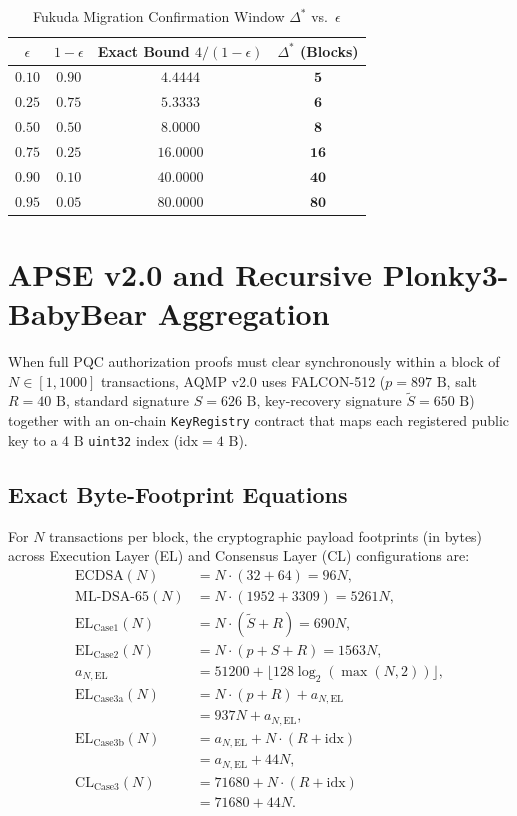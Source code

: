 \documentclass[conference,compsoc]{IEEEtran}
\begin{document}
\begin{table}[t]
\centering
\caption{Fukuda Migration Confirmation Window $\Delta^*$ vs.\ $\epsilon$}
\label{tab:fukuda}
\begin{tabular}{@{}cccc@{}}
\toprule
$\epsilon$ & $1 - \epsilon$ & Exact Bound $4/(1-\epsilon)$ & $\Delta^*$ (Blocks) \\
\midrule
$0.10$ & $0.90$ & $4.4444$ & $\mathbf{5}$ \\
$0.25$ & $0.75$ & $5.3333$ & $\mathbf{6}$ \\
$0.50$ & $0.50$ & $8.0000$ & $\mathbf{8}$ \\
$0.75$ & $0.25$ & $16.0000$ & $\mathbf{16}$ \\
$0.90$ & $0.10$ & $40.0000$ & $\mathbf{40}$ \\
$0.95$ & $0.05$ & $80.0000$ & $\mathbf{80}$ \\
\bottomrule
\end{tabular}
\end{table}

\section{APSE v2.0 and Recursive Plonky3-BabyBear Aggregation}
\label{sec:apse}

When full PQC authorization proofs must clear synchronously within a block of $N \in [1, 1000]$ transactions, AQMP v2.0 uses FALCON-512 ($p = 897\text{ B}$, salt $R = 40\text{ B}$, standard signature $S = 626\text{ B}$, key-recovery signature $\tilde{S} = 650\text{ B}$) together with an on-chain \texttt{KeyRegistry} contract that maps each registered public key to a $4\text{ B}$ \texttt{uint32} index ($\text{idx} = 4\text{ B}$).

\subsection{Exact Byte-Footprint Equations}
For $N$ transactions per block, the cryptographic payload footprints (in bytes) across Execution Layer (EL) and Consensus Layer (CL) configurations are:
\begin{align}
\text{ECDSA}(N) &= N \cdot (32 + 64) = 96N, \\
\text{ML-DSA-65}(N) &= N \cdot (1952 + 3309) = 5261N, \\
\text{EL}_{\text{Case1}}(N) &= N \cdot (\tilde{S} + R) = 690N, \\
\text{EL}_{\text{Case2}}(N) &= N \cdot (p + S + R) = 1563N, \\
a_{N,\text{EL}} &= 51200 + \lfloor 128 \log_2(\max(N, 2)) \rfloor, \\
\text{EL}_{\text{Case3a}}(N) &= N \cdot (p + R) + a_{N,\text{EL}} \nonumber \\
  &= 937N + a_{N,\text{EL}}, \\
\text{EL}_{\text{Case3b}}(N) &= a_{N,\text{EL}} + N \cdot (R + \text{idx}) \nonumber \\
  &= a_{N,\text{EL}} + 44N, \\
\text{CL}_{\text{Case3}}(N) &= 71680 + N \cdot (R + \text{idx}) \nonumber \\
  &= 71680 + 44N.
\end{align}
\end{document}
